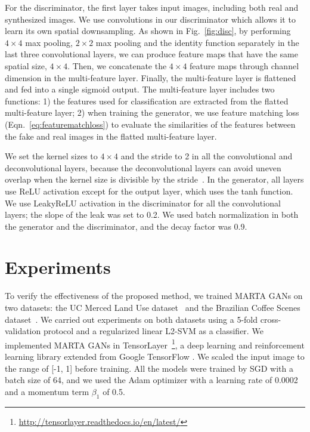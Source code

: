 \documentclass[journal]{IEEEtran}
\begin{document}
For the discriminator, the first layer takes input images, including both real and synthesized images. We use convolutions in our discriminator which allows it to learn its own spatial downsampling. As shown in Fig.~\ref{fig:disc}, by performing $4\times4$ max pooling, $2\times2$ max pooling and the identity function separately in the last three convolutional layers, we can produce feature maps that have the same spatial size, $4\times4$. Then, we concatenate the  $4\times4$ feature maps through channel dimension in the multi-feature layer.
Finally, the  multi-feature layer is flattened and fed into a single sigmoid output.
The multi-feature layer includes two functions: 1) the features used for classification are extracted from the flatted multi-feature layer; 2) when training the generator, we use feature matching loss (Eqn.~\ref{eq:featurematchloss}) to evaluate the similarities of the features between the fake and real images in the flatted multi-feature layer. %

We set the kernel sizes to $4\times4$ and the stride to 2 in all the convolutional and deconvolutional layers, because the deconvolutional layers can avoid uneven overlap when the kernel size is divisible by the stride~\cite{odena2016deconvolution}. In the generator, all layers use ReLU activation except for the output layer, which uses the tanh function. We use LeakyReLU activation in the discriminator for all the convolutional layers; the slope of the leak was set to 0.2.
We used batch normalization in both the generator and the discriminator, and the decay factor was 0.9.










\section{Experiments}
\label{subsect:experiments}
To verify the effectiveness of the proposed method, we trained MARTA GANs on two datasets: the UC Merced Land Use dataset~\cite{yang2010bag} and the Brazilian Coffee Scenes dataset~\cite{penatti2015deep}. We carried out experiments on both datasets using a 5-fold cross-validation protocol and a regularized linear L2-SVM as a classifier. We implemented MARTA GANs in TensorLayer~\footnote{\url{http://tensorlayer.readthedocs.io/en/latest/}}, a deep learning and reinforcement learning library extended from Google TensorFlow \cite{abadi2016tensorflow}. We scaled the input image to the range of [-1, 1] before training. All the models were trained by SGD with a batch size of 64, and we used the Adam optimizer with a learning rate of 0.0002 and a momentum term $\beta_1$ of 0.5.
\end{document}
